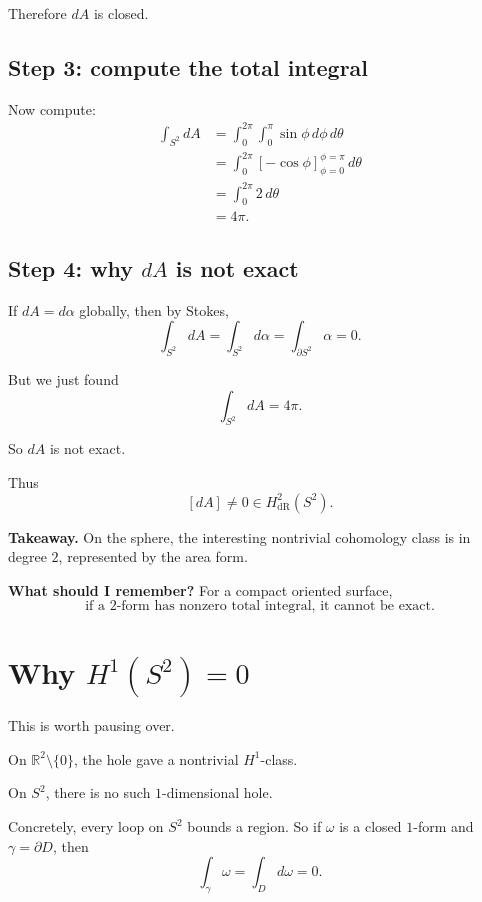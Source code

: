 \documentclass[11pt]{article}
\newenvironment{takeaway}
{\begin{framed}\noindent\textbf{Takeaway. }}
{\end{framed}}
\newenvironment{remember}
{\begin{framed}\noindent\textbf{What should I remember? }}
{\end{framed}}
\begin{document}
Therefore \(dA\) is closed.

\subsection{Step 3: compute the total integral}

Now compute:
\begin{align*}
\int_{S^2}dA
&=
\int_0^{2\pi}\int_0^\pi \sin\phi\,d\phi\,d\theta\\
&=
\int_0^{2\pi}\left[-\cos\phi\right]_{\phi=0}^{\phi=\pi}\,d\theta\\
&=
\int_0^{2\pi}2\,d\theta\\
&=
4\pi.
\end{align*}

\subsection{Step 4: why \(dA\) is not exact}

If \(dA=d\alpha\) globally, then by Stokes,
\[
\int_{S^2}dA=\int_{S^2}d\alpha=\int_{\partial S^2}\alpha=0.
\]

But we just found
\[
\int_{S^2}dA=4\pi.
\]

So \(dA\) is not exact.

Thus
\[
[dA]\neq 0\in H^2_{\mathrm{dR}}(S^2).
\]

\begin{takeaway}
On the sphere, the interesting nontrivial cohomology class is in degree \(2\), represented by the area form.
\end{takeaway}

\begin{remember}
For a compact oriented surface,
\[
\text{if a }2\text{-form has nonzero total integral, it cannot be exact.}
\]
\end{remember}

\section{Why \(H^1(S^2)=0\)}

This is worth pausing over.

On \(\mathbb{R}^2\setminus\{0\}\), the hole gave a nontrivial \(H^1\)-class.

On \(S^2\), there is no such \(1\)-dimensional hole.

Concretely, every loop on \(S^2\) bounds a region. So if \(\omega\) is a closed \(1\)-form and \(\gamma=\partial D\), then
\[
\int_\gamma \omega = \int_D d\omega = 0.
\]
\end{document}
